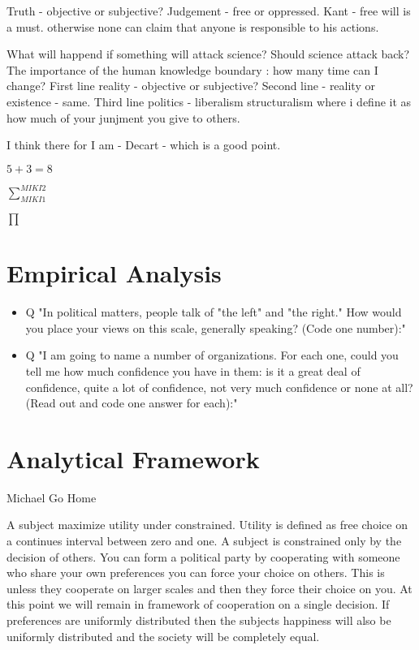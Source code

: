\documentclass[14pt,oneside]{amsart}
\begin{document}
Truth - objective or subjective?
Judgement - free or oppressed.
Kant - free will is a must. otherwise none can claim that anyone is responsible to his actions.

What will happend if something will attack science? Should science attack back? 
The importance of the human knowledge boundary :  how many time can I change? 
First line reality - objective or subjective?
Second line - reality or existence - same.
Third line politics - liberalism structuralism where i define it as how much of your junjment you give to others. 

I think there for I am - Decart - which is a good point.
 
$5+3=8$

$\sum_{MIKI1}^{MIKI2}$


$\prod$

\section{Empirical Analysis}
 
\begin{itemize}
\item Q "In political matters, people talk of "the left" and "the right." How would you place your views on this scale, generally speaking? (Code one number):"
\item Q "I am going to name a number of organizations. For each one, could you tell me how much confidence you have in them: is it a great deal of confidence, quite a lot of confidence, not very much confidence or none at all? (Read out and code one answer for each):"
\end{itemize} 

\section{Analytical Framework}
Michael Go Home


A subject maximize utility under constrained. Utility is defined as free choice on a continues interval between zero and one. A subject is constrained only by the decision of others. You can form a political party by cooperating with someone who share your own preferences you can force your choice on others. This is unless they cooperate on larger scales and then they force their choice on you. At this point we will remain in framework of cooperation on a single decision. If preferences are uniformly distributed then the subjects happiness will also be uniformly distributed and the society will be completely equal. 
\end{document}
